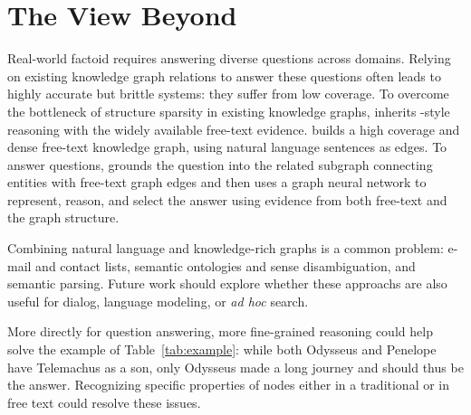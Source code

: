 \section{The View Beyond \name{}}
\label{sec:conclu}

Real-world factoid  requires answering diverse questions across domains.
%
Relying on existing knowledge graph relations to answer these questions often leads to highly accurate but brittle systems:
they suffer from low coverage.
%
To overcome the bottleneck of structure sparsity in existing knowledge graphs,
\name{} inherits 
-style reasoning with the widely available free-text evidence.
\name{} builds a high coverage and dense free-text knowledge graph, using
natural language sentences as edges.
%
To answer questions, \name{} grounds the question into the related
subgraph connecting entities with free-text graph edges and then uses
a graph neural network to represent, reason, and select the answer
using evidence from both free-text and the graph structure.

Combining natural language and knowledge-rich graphs is a common
problem:
%
e-mail and contact lists,
%
semantic ontologies and sense disambiguation,
%
and semantic parsing.
%
Future work should explore whether these approachs are also useful for
dialog, language modeling, or \textit{ad hoc} search.

More directly for question answering, more fine-grained reasoning
could help solve the example of Table~\ref{tab:example}:
%
while both Odysseus and Penelope have Telemachus as a son, only
Odysseus made a long journey and should thus be the answer.
%
Recognizing specific properties of nodes either in a traditional
 or in free text could resolve these issues.

